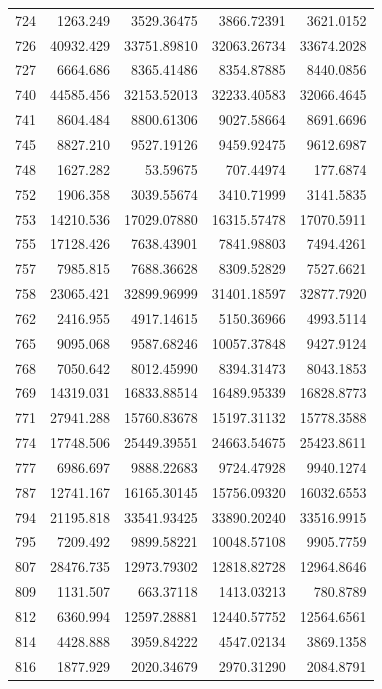 \documentclass[
  12pt,
]{article}
\begin{document}
\begin{longtable}[]{@{}lrrrr@{}}
724 & 1263.249 & 3529.36475 & 3866.72391 & 3621.0152 \\
726 & 40932.429 & 33751.89810 & 32063.26734 & 33674.2028 \\
727 & 6664.686 & 8365.41486 & 8354.87885 & 8440.0856 \\
740 & 44585.456 & 32153.52013 & 32233.40583 & 32066.4645 \\
741 & 8604.484 & 8800.61306 & 9027.58664 & 8691.6696 \\
745 & 8827.210 & 9527.19126 & 9459.92475 & 9612.6987 \\
748 & 1627.282 & 53.59675 & 707.44974 & 177.6874 \\
752 & 1906.358 & 3039.55674 & 3410.71999 & 3141.5835 \\
753 & 14210.536 & 17029.07880 & 16315.57478 & 17070.5911 \\
755 & 17128.426 & 7638.43901 & 7841.98803 & 7494.4261 \\
757 & 7985.815 & 7688.36628 & 8309.52829 & 7527.6621 \\
758 & 23065.421 & 32899.96999 & 31401.18597 & 32877.7920 \\
762 & 2416.955 & 4917.14615 & 5150.36966 & 4993.5114 \\
765 & 9095.068 & 9587.68246 & 10057.37848 & 9427.9124 \\
768 & 7050.642 & 8012.45990 & 8394.31473 & 8043.1853 \\
769 & 14319.031 & 16833.88514 & 16489.95339 & 16828.8773 \\
771 & 27941.288 & 15760.83678 & 15197.31132 & 15778.3588 \\
774 & 17748.506 & 25449.39551 & 24663.54675 & 25423.8611 \\
777 & 6986.697 & 9888.22683 & 9724.47928 & 9940.1274 \\
787 & 12741.167 & 16165.30145 & 15756.09320 & 16032.6553 \\
794 & 21195.818 & 33541.93425 & 33890.20240 & 33516.9915 \\
795 & 7209.492 & 9899.58221 & 10048.57108 & 9905.7759 \\
807 & 28476.735 & 12973.79302 & 12818.82728 & 12964.8646 \\
809 & 1131.507 & 663.37118 & 1413.03213 & 780.8789 \\
812 & 6360.994 & 12597.28881 & 12440.57752 & 12564.6561 \\
814 & 4428.888 & 3959.84222 & 4547.02134 & 3869.1358 \\
816 & 1877.929 & 2020.34679 & 2970.31290 & 2084.8791 \\

\end{longtable}
\end{document}
